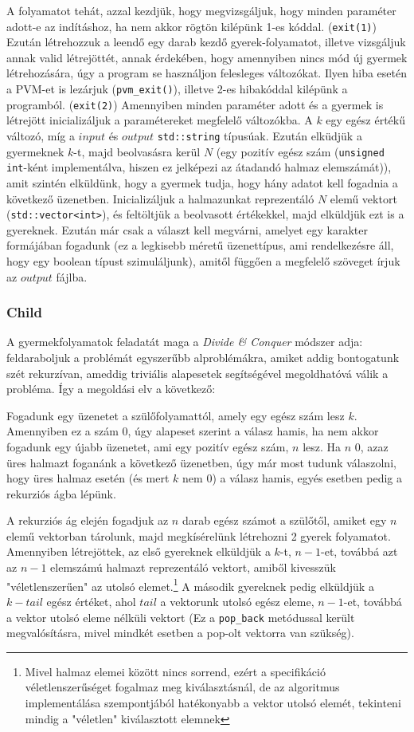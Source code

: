 \documentclass[12pt]{article}
\begin{document}
    A folyamatot tehát, azzal kezdjük, hogy megvizsgáljuk, hogy minden paraméter adott-e az indításhoz, ha nem akkor rögtön kilépünk 1-es kóddal. (\verb|exit(1)|) 
    Ezután létrehozzuk a leendő egy darab kezdő gyerek-folyamatot, illetve vizsgáljuk annak valid létrejöttét, annak érdekében, hogy amennyiben nincs mód új gyermek létrehozására, úgy a program se használjon felesleges változókat. Ilyen hiba esetén a PVM-et is lezárjuk (\verb|pvm_exit()|), illetve 2-es hibakóddal kilépünk a programból. (\verb|exit(2)|)
    Amennyiben minden paraméter adott és a gyermek is létrejött inicializáljuk  a paramétereket megfelelő változókba. A $k$ egy egész értékű változó, míg a $input$ és $output$ \verb|std::string| típusúak.
    Ezután elküdjük a gyermeknek $k$-t, majd beolvasásra kerül $N$ (egy pozitív egész szám (\verb|unsigned int|-ként implementálva, hiszen ez jelképezi az átadandó halmaz elemszámát)), amit szintén elküldünk, hogy a gyermek tudja, hogy hány adatot kell fogadnia a következő üzenetben. Inicializáljuk a halmazunkat reprezentáló $N$ elemű vektort (\verb|std::vector<int>|), és feltöltjük a beolvasott értékekkel, majd elküldjük ezt is a gyereknek.
    Ezután már csak a választ kell megvárni, amelyet egy karakter formájában fogadunk (ez a legkisebb méretű üzenettípus, ami rendelkezésre áll, hogy egy boolean típust szimuláljunk), amitől függően a megfelelő szöveget írjuk az $output$ fájlba.

	\subsubsection{Child}
    
    A gyermekfolyamatok feladatát maga a \textit{Divide \& Conquer} módszer adja: feldaraboljuk a problémát egyszerűbb alproblémákra, amiket addig bontogatunk szét rekurzívan, ameddig triviális alapesetek segítségével megoldhatóvá válik a probléma.
    Így a megoldási elv a következő:
    
    Fogadunk egy üzenetet a szülőfolyamattól, amely egy egész szám lesz $k$. Amennyiben ez a szám 0, úgy alapeset szerint a válasz hamis, ha nem akkor fogadunk egy újabb üzenetet, ami egy pozitív egész szám, $n$ lesz. Ha $n$ 0, azaz üres halmazt foganánk a következő üzenetben, úgy már most tudunk válaszolni, hogy üres halmaz esetén (és mert $k$ nem 0) a válasz hamis, egyés esetben pedig a rekurziós ágba lépünk.
    
    A rekurziós ág elején fogadjuk az $n$ darab egész számot a szülőtől, amiket egy $n$ elemű vektorban tárolunk, majd megkísérelünk létrehozni 2 gyerek folyamatot. Amennyiben létrejöttek, az első gyereknek elküldjük a $k$-t, $n-1$-et, továbbá azt az $n-1$ elemszámú halmazt reprezentáló vektort, amiből kivesszük "véletlenszerűen" az utolsó elemet.\footnote{Mivel halmaz elemei között nincs sorrend, ezért a specifikáció véletlenszerűséget fogalmaz meg kiválasztásnál, de az algoritmus implementálása szempontjából hatékonyabb a vektor utolsó elemét, tekinteni mindig a "véletlen" kiválasztott elemnek}
A második gyereknek pedig elküldjük a $k-tail$ egész értéket, ahol $tail$ a vektorunk utolsó egész eleme, $n-1$-et, továbbá a vektor utolsó eleme nélküli vektort (Ez a \verb|pop_back| metódussal került megvalósításra, mivel mindkét esetben a pop-olt vektorra van szükség).
\end{document}

